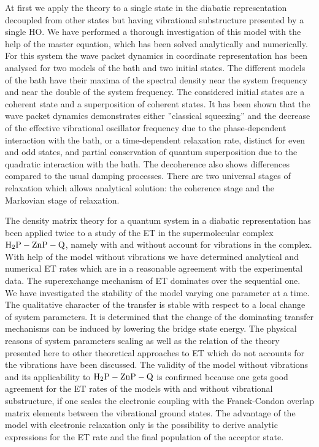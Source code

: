 \documentclass[12pt,twoside,a4paper]{report}
\begin{document}
{At first we apply the theory to a single state in the diabatic representation 
decoupled from
other states but having vibrational substructure presented by
a single HO.
We have performed a thorough investigation of this model
with the help of the master equation, which
has been solved analytically and numerically. 
For this system the wave packet dynamics in coordinate representation 
has been analysed
for two models of the bath and two initial states.
The different models of the bath 
have their maxima of the spectral density 
near the system frequency and near the double of the system frequency.
The considered initial states are
a coherent state and a superposition of coherent states. 
It has 
been shown that the wave packet dynamics demonstrates 
either
''classical squeezing''
and the decrease of the effective vibrational oscillator frequency due
to the phase-dependent interaction with the bath,
or a time-dependent relaxation rate, distinct for even and odd states,
and partial conservation of quantum superposition
due to the quadratic interaction with the bath.  
The decoherence
also shows differences compared to the usual damping processes.
There are two universal stages of relaxation
which allows analytical solution: the
coherence stage and the Markovian stage of relaxation.



The density matrix theory for a quantum system in a diabatic representation
has been applied twice to
a study of the ET in the
supermolecular complex ${\rm H_2P}-{\rm ZnP}-{\rm Q}$, namely
with and without account for vibrations in the complex.
With help of the model without vibrations we have 
determined analytical and numerical ET rates which are in
a reasonable agreement with the experimental data.  
The superexchange mechanism of ET dominates over the
sequential one.  We have investigated the stability of the model
varying one parameter at a time.  The
qualitative character of the transfer is stable with respect to a
local change of system parameters.  It is determined that the
change of the dominating
transfer mechanisms can be induced by
lowering the bridge state energy.  
The physical reasons of system parameters scaling
as well
as the relation of the theory
presented here to other theoretical approaches to ET
which do not accounts for the vibrations
have been discussed.
The validity of the  model without vibrations and 
its applicability to  ${\rm H_2P}-{\rm ZnP}-{\rm Q}$
is confirmed because
one gets good agreement for the ET rates of
the models with and without vibrational substructure, 
if one scales the electronic coupling with the
Franck-Condon overlap matrix elements between the vibrational ground
states.  The advantage of the model with electronic relaxation only is the
possibility to derive analytic expressions for the ET rate and the final
population of the acceptor state. 


}
\end{document}
